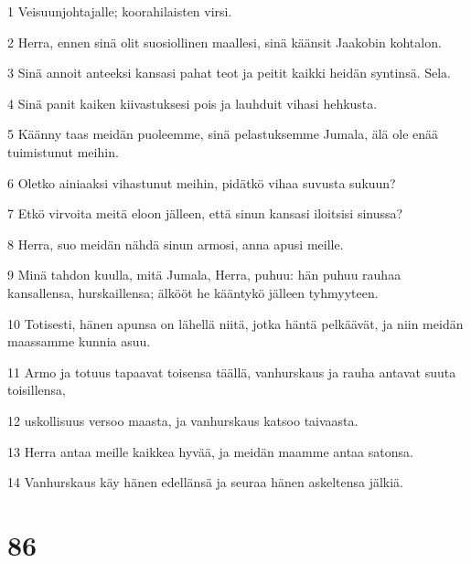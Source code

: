 \par 1 Veisuunjohtajalle; koorahilaisten virsi.
\par 2 Herra, ennen sinä olit suosiollinen maallesi, sinä käänsit Jaakobin kohtalon.
\par 3 Sinä annoit anteeksi kansasi pahat teot ja peitit kaikki heidän syntinsä. Sela.
\par 4 Sinä panit kaiken kiivastuksesi pois ja lauhduit vihasi hehkusta.
\par 5 Käänny taas meidän puoleemme, sinä pelastuksemme Jumala, älä ole enää tuimistunut meihin.
\par 6 Oletko ainiaaksi vihastunut meihin, pidätkö vihaa suvusta sukuun?
\par 7 Etkö virvoita meitä eloon jälleen, että sinun kansasi iloitsisi sinussa?
\par 8 Herra, suo meidän nähdä sinun armosi, anna apusi meille.
\par 9 Minä tahdon kuulla, mitä Jumala, Herra, puhuu: hän puhuu rauhaa kansallensa, hurskaillensa; älkööt he kääntykö jälleen tyhmyyteen.
\par 10 Totisesti, hänen apunsa on lähellä niitä, jotka häntä pelkäävät, ja niin meidän maassamme kunnia asuu.
\par 11 Armo ja totuus tapaavat toisensa täällä, vanhurskaus ja rauha antavat suuta toisillensa,
\par 12 uskollisuus versoo maasta, ja vanhurskaus katsoo taivaasta.
\par 13 Herra antaa meille kaikkea hyvää, ja meidän maamme antaa satonsa.
\par 14 Vanhurskaus käy hänen edellänsä ja seuraa hänen askeltensa jälkiä.

\chapter{86}

